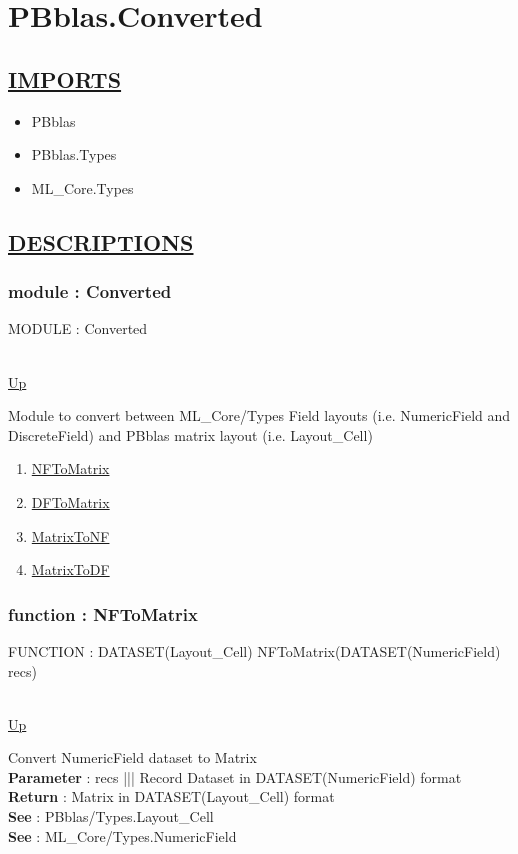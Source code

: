 \chapter*{PBblas.Converted}
\hypertarget{PBblas.Converted}{}

\section*{\underline{IMPORTS}}
\begin{itemize}
\item PBblas
\item PBblas.Types
\item ML\_Core.Types
\end{itemize}

\section*{\underline{DESCRIPTIONS}}
\subsection*{module : Converted}
\hypertarget{ecldoc:PBblas.Converted}{MODULE : Converted} \\
\hyperlink{ecldoc:}{Up} \\
\par
Module to convert between ML\_Core/Types Field layouts (i.e. NumericField and DiscreteField) and PBblas matrix layout (i.e. Layout\_Cell) \\
\begin{enumerate}
\item \hyperlink{ecldoc:pbblas.converted.nftomatrix}{NFToMatrix}
\item \hyperlink{ecldoc:pbblas.converted.dftomatrix}{DFToMatrix}
\item \hyperlink{ecldoc:pbblas.converted.matrixtonf}{MatrixToNF}
\item \hyperlink{ecldoc:pbblas.converted.matrixtodf}{MatrixToDF}
\end{enumerate}
\subsection*{function : NFToMatrix}
\hypertarget{ecldoc:pbblas.converted.nftomatrix}{FUNCTION : DATASET(Layout\_Cell) NFToMatrix(DATASET(NumericField) recs)} \\
\hyperlink{ecldoc:PBblas.Converted}{Up} \\
\par
Convert NumericField dataset to Matrix \\
\textbf{Parameter} : recs ||| Record Dataset in DATASET(NumericField) format \\
\textbf{Return} : Matrix in DATASET(Layout\_Cell) format \\
\textbf{See} : PBblas/Types.Layout\_Cell \\
\textbf{See} : ML\_Core/Types.NumericField \\

